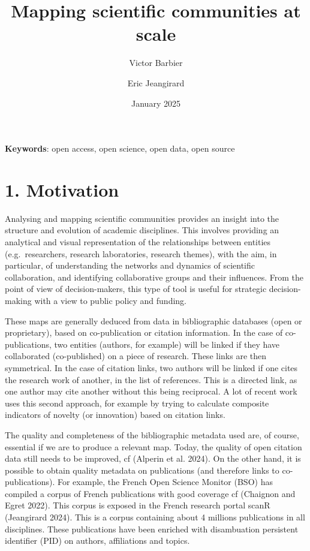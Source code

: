 \documentclass[
]{article}
\title{Mapping scientific communities at scale}
\author[%
  1%
  ]{%
  Victor Barbier%
}
\author[%
  1%
  ]{%
  Eric Jeangirard%
}
\affil[1]{French Ministry of Higher Education and Research, Paris,
France}
\date{January 2025}
\begin{document}
\maketitle

\textbf{Keywords}: open access, open science, open data, open source

\hypertarget{motivation}{%
\section{1. Motivation}\label{motivation}}

Analysing and mapping scientific communities provides an insight into
the structure and evolution of academic disciplines. This involves
providing an analytical and visual representation of the relationships
between entities (e.g.~researchers, research laboratories, research
themes), with the aim, in particular, of understanding the networks and
dynamics of scientific collaboration, and identifying collaborative
groups and their influences. From the point of view of decision-makers,
this type of tool is useful for strategic decision-making with a view to
public policy and funding.

These maps are generally deduced from data in bibliographic databases
(open or proprietary), based on co-publication or citation information.
In the case of co-publications, two entities (authors, for example) will
be linked if they have collaborated (co-published) on a piece of
research. These links are then symmetrical. In the case of citation
links, two authors will be linked if one cites the research work of
another, in the list of references. This is a directed link, as one
author may cite another without this being reciprocal. A lot of recent
work uses this second approach, for example by trying to calculate
composite indicators of novelty (or innovation) based on citation links.

The quality and completeness of the bibliographic metadata used are, of
course, essential if we are to produce a relevant map. Today, the
quality of open citation data still needs to be improved, cf (Alperin et
al. 2024). On the other hand, it is possible to obtain quality metadata
on publications (and therefore links to co-publications). For example,
the French Open Science Monitor (BSO) has compiled a corpus of French
publications with good coverage cf (Chaignon and Egret 2022). This
corpus is exposed in the French research portal scanR (Jeangirard 2024).
This is a corpus containing about 4 millions publications in all
disciplines. These publications have been enriched with disambuation
persistent identifier (PID) on authors, affiliations and topics.
\end{document}
